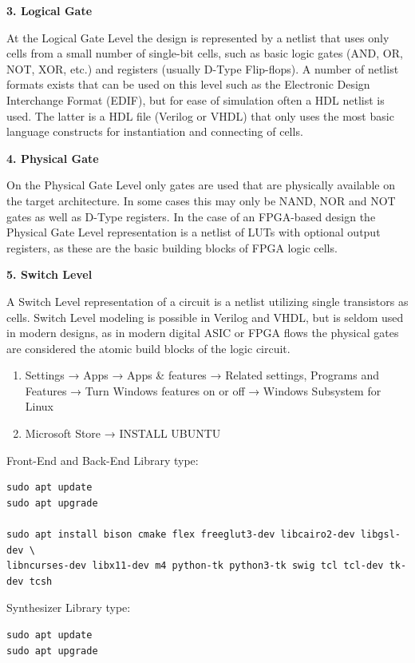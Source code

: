 \documentclass[
]{article}
\begin{document}
\textbf{3. Logical Gate}

At the Logical Gate Level the design is represented by a netlist that
uses only cells from a small number of single-bit cells, such as basic
logic gates (AND, OR, NOT, XOR, etc.) and registers (usually D-Type
Flip-flops). A number of netlist formats exists that can be used on this
level such as the Electronic Design Interchange Format (EDIF), but for
ease of simulation often a HDL netlist is used. The latter is a HDL file
(Verilog or VHDL) that only uses the most basic language constructs for
instantiation and connecting of cells.

\textbf{4. Physical Gate}

On the Physical Gate Level only gates are used that are physically
available on the target architecture. In some cases this may only be
NAND, NOR and NOT gates as well as D-Type registers. In the case of an
FPGA-based design the Physical Gate Level representation is a netlist of
LUTs with optional output registers, as these are the basic building
blocks of FPGA logic cells.

\textbf{5. Switch Level}

A Switch Level representation of a circuit is a netlist utilizing single
transistors as cells. Switch Level modeling is possible in Verilog and
VHDL, but is seldom used in modern designs, as in modern digital ASIC or
FPGA flows the physical gates are considered the atomic build blocks of
the logic circuit.

\begin{enumerate}
\def\labelenumi{\arabic{enumi}.}
\item
  Settings → Apps → Apps \& features → Related settings, Programs and
  Features → Turn Windows features on or off → Windows Subsystem for
  Linux
\item
  Microsoft Store → INSTALL UBUNTU
\end{enumerate}

Front-End and Back-End Library type:

\begin{verbatim}
sudo apt update
sudo apt upgrade

sudo apt install bison cmake flex freeglut3-dev libcairo2-dev libgsl-dev \
libncurses-dev libx11-dev m4 python-tk python3-tk swig tcl tcl-dev tk-dev tcsh
\end{verbatim}

Synthesizer Library type:

\begin{verbatim}
sudo apt update
sudo apt upgrade
\end{verbatim}
\end{document}
